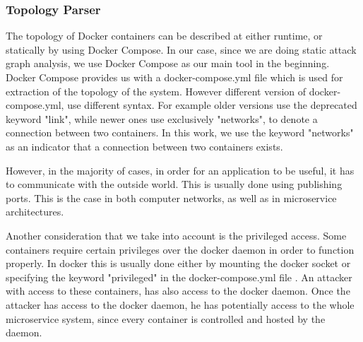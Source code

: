 \documentclass[letterpaper, 10 pt, conference]{ieeeconf}  %
\begin{document}
\subsubsection{Topology Parser}
The topology of Docker containers can be described at either runtime, or statically by using Docker Compose. In our case, since we are doing static attack graph analysis, we use Docker Compose as our main tool in the beginning. Docker Compose provides us with a docker-compose.yml file which is used for extraction of the topology of the system. However different version of docker-compose.yml, use different syntax. For example older versions use the deprecated keyword "link", while newer ones use exclusively "networks", to denote a connection between two containers. In this work, we use the keyword "networks" as an indicator that a connection between two containers exists.

However, in the majority of cases, in order for an application to be useful, it has to communicate with the outside world. This is usually done using publishing ports. This is the case in both computer networks, as well as in microservice architectures.

Another consideration that we take into account is the privileged access. Some containers require certain privileges over the docker daemon in order to function properly. In docker this is usually done either by mounting the docker socket or specifying the keyword "privileged" in the docker-compose.yml file . An attacker with access to these containers, has also access to the docker daemon. Once the attacker has access to the docker daemon, he has potentially access to the whole microservice system, since every container is controlled and hosted by the daemon.
\end{document}
